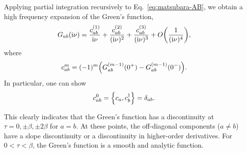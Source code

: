 \documentclass[submission, LectureNotes]{SciPost}
\newcommand\ii{\mathrm{i}}%
\newcommand\iv{\ii\nu}%
\begin{document}
Applying partial integration recursively to Eq.~\eqref{eq:matsubara-AB},
we obtain a high frequency expansion of the Green's function,
\begin{align}
    G_{ab}(\iv) &= 
    \frac{c^{(1)}_{ab}}{\iv} +
    \frac{c^{(2)}_{ab}}{(\iv)^2} +
    \frac{c^{(3)}_{ab}}{(\iv)^3} +
    O\qty(\frac{1}{(\iv)^4}),
\end{align}
where
\begin{align}
    c^{m}_{ab} &= (-1)^{m} \qty(G_{ab}^{(m-1)}(0^+) - G_{ab}^{(m-1)}(0^-)).
\end{align}
In particular, one can show
\begin{align}
   c^{0}_{ab} &= \poissonbracket{c_a}{c^\dagger_b} = \delta_{ab}.
\end{align}

This clearly indicates that the Green's function has a discontinuity at $\tau=0,\pm \beta, \pm 2\beta$ for $a=b$.
At these points, the off-diagonal components ($a\neq b$) have a slope discontinuity or a discontinuity in higher-order derivatives.
For $0 <\tau < \beta$, the Green's function is a smooth and analytic function.
%
%
%
%
\end{document}
